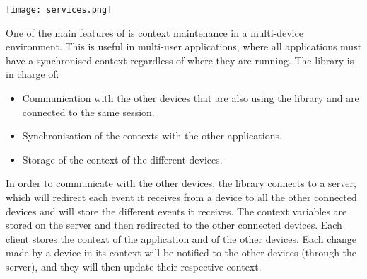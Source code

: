 \begin{figure*}[htbp]
    \centering
    \texttt{[image: services.png]}
    \caption{\fontsize{10pt}{11pt}}
    \label{fig:orkservices}
\end{figure*}

One of the main features of \ork{} is context maintenance in a multi-device environment. This is useful in multi-user applications, where all applications must have a synchronised context regardless of where they are running. The \ork{} library is in charge of:
\begin{itemize}
    \item Communication with the other devices that are also using the library and are connected to the same session.
    \item Synchronisation of the contexts with the other applications.
    \item Storage of the context of the different devices.
\end{itemize} 

In order to communicate with the other devices, the library connects to a server, which will redirect each event it receives from a device to all the other connected devices and will store the different events it receives. The context variables are stored on the server and then redirected to the other connected devices. Each client stores the context of the application and of the other devices. Each change made by a device in its context will be notified to the other devices (through the server), and they will then update their respective context.

